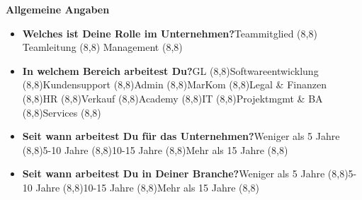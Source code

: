 \documentclass[../../main.tex]{subfiles}
\begin{document}
\normalsize{\textbf{Allgemeine Angaben}}
\begin{itemize}
\setlength\itemsep{-1mm}
  \item \textbf{Welches ist Deine Rolle im Unternehmen?}\newline \footnotesize{Teammitglied \framebox(8,8){}\hspace{1cm} Teamleitung \framebox(8,8){}\hspace{1cm} Management \framebox(8,8){} }\normalsize
  
  \item \textbf{In welchem Bereich arbeitest Du?}\newline \footnotesize{GL \framebox(8,8){}\hspace{0.5cm}Softwareentwicklung \framebox(8,8){}\hspace{1cm}Kundensupport \framebox(8,8){}\hspace{1cm}Admin \framebox(8,8){}\hspace{1cm}MarKom \framebox(8,8){}\hspace{1cm}Legal \& Finanzen \framebox(8,8){}\hspace{1cm}HR \framebox(8,8){}\hspace{1cm}Verkauf \framebox(8,8){}\hspace{1cm}Academy \framebox(8,8){}\hspace{1cm}IT \framebox(8,8){}\hspace{0.5cm}Projektmgmt \& BA \framebox(8,8){}\hspace{0.5cm}Services \framebox(8,8){} }\normalsize
  
  \item \textbf{Seit wann arbeitest Du für das Unternehmen?}\newline \footnotesize{Weniger als 5 Jahre \framebox(8,8){}\hspace{1cm}5-10 Jahre \framebox(8,8){}\hspace{1cm}10-15 Jahre \framebox(8,8){}\hspace{1cm}Mehr als 15 Jahre \framebox(8,8){} }\normalsize
  
  \item \textbf{Seit wann arbeitest Du in Deiner Branche?}\newline \footnotesize{Weniger als 5 Jahre \framebox(8,8){}\hspace{1cm}5-10 Jahre \framebox(8,8){}\hspace{1cm}10-15 Jahre \framebox(8,8){}\hspace{1cm}Mehr als 15 Jahre \framebox(8,8){} }\normalsize
  

\end{itemize}
\end{document}
